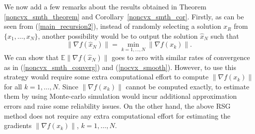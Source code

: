 \documentclass[final]{siamltex}
\newcommand{\beq}{\begin{equation}}
\newcommand{\eeq}{\end{equation}}
\def\eqnok#1{(\ref{#1})}
\def\vgap{\vspace*{.1in}}
\newcommand{\bbe}{\mathbb{E}}
\def\SFO{{\cal SFO}}
\def\cB{{\cal B}}
\begin{document}
\vgap



We now add a few remarks about the results obtained in Theorem \ref{noncvx_smth_theorem}
and Corollary~\ref{noncvx_smth_cor}.
Firstly, as can be seen from \eqnok{main_recursion2}, instead of randomly selecting a solution
$x_R$ from $\{x_1, \ldots, x_N\}$, another possibility would be to output
the solution $\hat x_N$ such that
\beq \label{DSG}
\|\nabla f(\hat x_N)\| = \min_{k=1,\ldots, N} \|\nabla f(x_k)\|.
\eeq
We can show that $\bbe\|\nabla f(\hat x_N)\|$ goes to zero with
similar rates of convergence as in \eqnok{noncvx_smth_converg} and \eqnok{nocvx_smooth}.
However, to use this strategy would require some extra computational effort
to compute $\|\nabla f(x_k)\|$ for all $k = 1, \ldots, N$.
Since $\|\nabla f(x_k)\|$ cannot be computed exactly, to estimate them
by using Monte-carlo simulation would incur additional
approximation errors and raise some reliability issues.
On the other hand, the above RSG method does not require any extra
computational effort for estimating the gradients $\|\nabla f(x_k)\|$, $k = 1, \ldots, N$.
\end{document}
